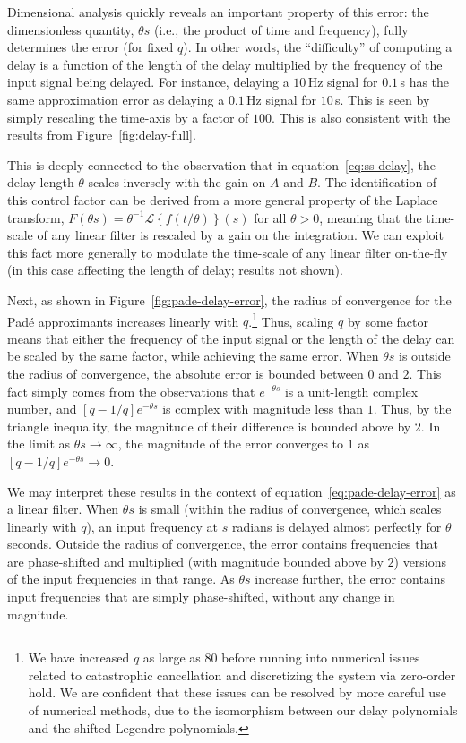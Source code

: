 Dimensional analysis quickly reveals an important property of this error: the dimensionless quantity, $\theta s$ (i.e., the product of time and frequency), fully determines the error (for fixed $q$).
In other words, the ``difficulty'' of computing a delay is a function of the length of the delay multiplied by the frequency of the input signal being delayed.
For instance, delaying a $10$\,Hz signal for $0.1$\,s has the same approximation error as delaying a $0.1$\,Hz signal for $10$\,s.
This is seen by simply rescaling the time-axis by a factor of $100$.
This is also consistent with the results from Figure~\ref{fig:delay-full}.

This is deeply connected to the observation that in equation~\ref{eq:ss-delay}, the delay length $\theta$ scales inversely with the gain on $A$ and $B$.
The identification of this control factor can be derived from a more general property of the Laplace transform, $F \left( \theta s \right) = \theta^{-1} \mathcal{L} \left\{ f \left( t / \theta \right) \right\} (s)$ for all $\theta > 0$, meaning that the time-scale of any linear filter is rescaled by a gain on the integration.
We can exploit this fact more generally to modulate the time-scale of any linear filter on-the-fly (in this case affecting the length of delay; results not shown).

Next, as shown in Figure~\ref{fig:pade-delay-error}, the radius of convergence for the Pad\'e approximants increases linearly with $q$.\footnote{%
We have increased $q$ as large as $80$ before running into numerical issues related to catastrophic cancellation and discretizing the system via zero-order hold.
We are confident that these issues can be resolved by more careful use of numerical methods, due to the isomorphism between our delay polynomials and the shifted Legendre polynomials.}
Thus, scaling $q$ by some factor means that either the frequency of the input signal or the length of the delay can be scaled by the same factor, while achieving the same error.
When $\theta s$ is outside the radius of convergence, the absolute error is bounded between $0$ and $2$.
This fact simply comes from the observations that $e^{-\theta s}$ is a unit-length complex number, and $[q-1/q]e^{-\theta s}$ is complex with magnitude less than $1$.
Thus, by the triangle inequality, the magnitude of their difference is bounded above by $2$.
In the limit as $\theta s \rightarrow \infty$, the magnitude of the error converges to $1$ as $[q-1/q]e^{-\theta s} \rightarrow 0$.

We may interpret these results in the context of equation~\ref{eq:pade-delay-error} as a linear filter.
When $\theta s$ is small (within the radius of convergence, which scales linearly with $q$), an input frequency at $s$ radians is delayed almost perfectly for $\theta$ seconds.
Outside the radius of convergence, the error contains frequencies that are phase-shifted and multiplied (with magnitude bounded above by $2$) versions of the input frequencies in that range.
As $\theta s$ increase further, the error contains input frequencies that are simply phase-shifted, without any change in magnitude.

